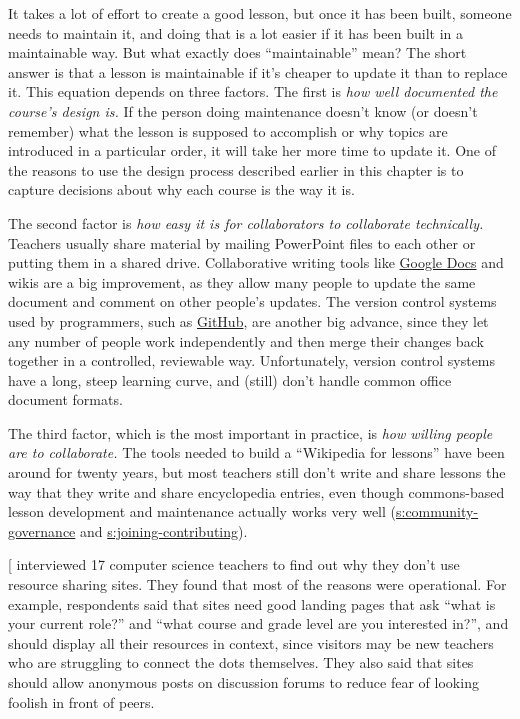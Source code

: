 It takes a lot of effort to create a good lesson, but once it has been
built, someone needs to maintain it, and doing that is a lot easier if
it has been built in a maintainable way. But what exactly does
``maintainable'' mean? The short answer is that a lesson is maintainable
if it's cheaper to update it than to replace it. This equation depends
on three factors. The first is \emph{how well documented the course's
design is.} If the person doing maintenance doesn't know (or doesn't
remember) what the lesson is supposed to accomplish or why topics are
introduced in a particular order, it will take her more time to update
it. One of the reasons to use the design process described earlier in
this chapter is to capture decisions about why each course is the way
it is.

The second factor is \emph{how easy it is for collaborators to collaborate
technically.} Teachers usually share material by mailing PowerPoint
files to each other or putting them in a shared drive. Collaborative
writing tools like \href{http://docs.google.com}{Google Docs} and wikis are
a big improvement, as they allow many people to update the same
document and comment on other people's updates. The version control
systems used by programmers, such as \href{http://github.com}{GitHub}, are
another big advance, since they let any number of people work
independently and then merge their changes back together in a
controlled, reviewable way. Unfortunately, version control systems
have a long, steep learning curve, and (still) don't handle common
office document formats.

The third factor, which is the most important in practice, is \emph{how
willing people are to collaborate.} The tools needed to build a
``Wikipedia for lessons'' have been around for twenty years, but most
teachers still don't write and share lessons the way that they write
and share encyclopedia entries, even though commons-based lesson
development and maintenance actually works very well
(\protect\hyperlink{SECTION}{s:community-governance} and
\protect\hyperlink{SECTION}{s:joining-contributing}).

{[}\protect[\hyperlink{b:Leak2017}{Leak2017}]{]} interviewed 17 computer science teachers to find
out why they don't use resource sharing sites. They found that most of
the reasons were operational. For example, respondents said that sites
need good landing pages that ask ``what is your current role?'' and
``what course and grade level are you interested in?'', and should
display all their resources in context, since visitors may be new
teachers who are struggling to connect the dots themselves. They also
said that sites should allow anonymous posts on discussion forums to
reduce fear of looking foolish in front of peers.

